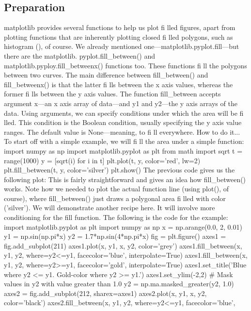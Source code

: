 \subsection{Preparation}
matplotlib provides several functions to help us plot fi lled figures, apart from plotting functions
that are inherently plotting closed fi lled polygons, such as histogram (), of course.
We already mentioned one—matplotlib.pyplot.fill—but there are the matplotlib.
pyplot.fill_between() and matplotlib.pyploy.fill_betweenx() functions
too. These functions fi ll the polygons between two curves. The main difference between
fill_between() and fill_betweenx() is that the latter fi lls between the x axis
values, whereas the former fi lls between the y axis values.
The function fill_between accepts argument x—an x axis array of data—and y1 and
y2—the y axis arrays of the data. Using arguments, we can specify conditions under which
the area will be fi lled. This condition is the Boolean condition, usually specifying the y axis
value ranges. The default value is None—meaning, to fi ll everywhere.
How to do it...
To start off with a simple example, we will fi ll the area under a simple function:
import numpy as np
import matplotlib.pyplot as plt
from math import sqrt
t = range(1000)
y = [sqrt(i) for i in t]
plt.plot(t, y, color='red', lw=2)
plt.fill_between(t, y, color='silver')
plt.show()
The previous code gives us the following plot:
This is fairly straightforward and gives an idea how fill_between() works. Note how we
needed to plot the actual function line (using plot(), of course), where fill_between()
just draws a polygonal area fi lled with color ('silver').
We will demonstrate another recipe here. It will involve more conditioning for the fill
function. The following is the code for the example:
import matplotlib.pyplot as plt
import numpy as np
x = np.arange(0.0, 2, 0.01)
y1 = np.sin(np.pi*x)
y2 = 1.7*np.sin(4*np.pi*x)
fig = plt.figure()
axes1 = fig.add_subplot(211)
axes1.plot(x, y1, x, y2, color='grey')
axes1.fill_between(x, y1, y2, where=y2<=y1, facecolor='blue',
interpolate=True)
axes1.fill_between(x, y1, y2, where=y2>=y1, facecolor='gold',
interpolate=True)
axes1.set_title('Blue where y2 <= y1. Gold-color where y2 >= y1.')
axes1.set_ylim(-2,2)
# Mask values in y2 with value greater than 1.0
y2 = np.ma.masked_greater(y2, 1.0)
axes2 = fig.add_subplot(212, sharex=axes1)
axes2.plot(x, y1, x, y2, color='black')
axes2.fill_between(x, y1, y2, where=y2<=y1, facecolor='blue',
